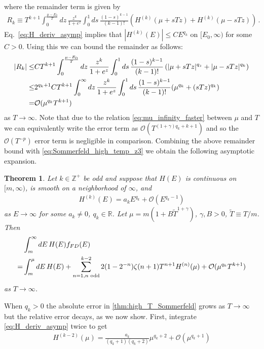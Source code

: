 \documentclass[sn-mathphys,Numbered]{sn-jnl}
\newtheorem{theorem}{Theorem}
\begin{document}
where the remainder term is given by
\begin{align}
    R_k\equiv T^{k+1}\int_0^{\frac{\mu-E_0}{T}} dz \,\frac{z^k}{1+e^{z}}
 \int_0^1 ds\, \frac{(1-s)^{k-1}}{(k-1)!} (H^{(k)}(\mu+sTz)+H^{(k)}(\mu-sTz))\,.
\end{align}
Eq.~\eqref{eq:H_deriv_asymp} implies that $|H^{(k)}(E)|\leq CE^{q_k}$ on $[E_0,\infty)$ for some $C>0$. Using this we can bound the remainder as follows:
\begin{align}
    |R_k|\leq &CT^{k+1}\int_0^{\frac{\mu-E_0}{T}} dz \,\frac{z^k}{1+e^{z}}
 \int_0^1 ds\, \frac{(1-s)^{k-1}}{(k-1)!} \left(|\mu+sTz|^{q_z}+|\mu-sTz|^{q_k}\right)\notag\\
 \leq&2^{q_k+1}CT^{k+1}\int_0^{\infty} dz \,\frac{z^k}{1+e^{z}}\notag
 \int_0^1 ds\, \frac{(1-s)^{k-1}}{(k-1)!} (\mu^{q_k}+(sTz)^{q_k})\notag\\
 =&\mathcal{O}(\mu^{q_k}T^{k+1})\label{eq:Sommerfeld_high_T_remainder_bound}
\end{align}
as $T\to\infty$.  Note that due to the  relation \eqref{eq:mu_infinity_faster} between $\mu$ and $T$ we can equivalently write the error term as $\mathcal{O}(T^{(1+\gamma)q_k+k+1})$ and so the $\mathcal{O}(T^{-p})$ error term is negligible in comparison. Combining the above remainder bound with \eqref{eq:Sommerfeld_high_temp_z3} we obtain the following asymptotic expansion.
\begin{theorem}\label{thm:high_T_Sommerfeld}
Let $k\in\mathbb{Z}^+$ be odd and suppose that $H(E)$ is continuous on $[m,\infty)$, is smooth on a neighborhood of $\infty$, and
\begin{align}
  H^{(k)}(E)=a_kE^{q_k}+\mathcal{O}(E^{q_k-1})  
\end{align}
as $E\to \infty$ for some $a_k\neq 0$, $q_k\in\mathbb{R}$.  Let $\mu=m(1+B\widetilde{T}^{1+\gamma})$, $\gamma,B>0$, $\widetilde{T}\equiv T/m$. Then
\begin{align}
    &\int_m^\infty dE\, H(E)f_{FD}(E)\notag\\
=&\int_m^\mu dE\, H(E)+\sum_{n=1,n\text{ odd}}^{k-2} 2(1-2^{-n})\zeta(n+1)T^{n+1}H^{(n)}(\mu)+\mathcal{O}(\mu^{q_k}T^{k+1})\label{eq:Sommerfeld_high_temp_final}
\end{align}
as $T\to\infty$.
\end{theorem}
When $q_k>0$ the absolute error in \eqref{thm:high_T_Sommerfeld}  grows as $T\to\infty$ but the relative error decays, as we now show.  First, integrate \eqref{eq:H_deriv_asymp} twice to get
\begin{align}\label{eq:integrate_H_asymp}
    H^{(k-2)}(\mu)=\frac{a_k}{(q_k+1)(q_k+2)}\mu^{q_k+2}+\mathcal{O}(\mu^{q_k+1})
\end{align}
\end{document}
